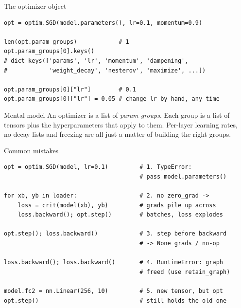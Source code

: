 \documentclass[10pt,aspectratio=169]{beamer}
\begin{document}
\begin{frame}[fragile]{The optimizer object}
\begin{lstlisting}
opt = optim.SGD(model.parameters(), lr=0.1, momentum=0.9)

len(opt.param_groups)            # 1
opt.param_groups[0].keys()
# dict_keys(['params', 'lr', 'momentum', 'dampening',
#            'weight_decay', 'nesterov', 'maximize', ...])

opt.param_groups[0]["lr"]        # 0.1
opt.param_groups[0]["lr"] = 0.05 # change lr by hand, any time
\end{lstlisting}
\begin{block}{Mental model}
An optimizer is a list of \emph{param groups}. Each group is a list of tensors plus the
hyperparameters that apply to them. Per-layer learning rates, no-decay lists and freezing are
all just a matter of building the right groups.
\end{block}
\end{frame}

\begin{frame}[fragile]{Common mistakes}
\begin{lstlisting}
opt = optim.SGD(model, lr=0.1)         # 1. TypeError:
                                       # pass model.parameters()

for xb, yb in loader:                  # 2. no zero_grad ->
    loss = crit(model(xb), yb)         # grads pile up across
    loss.backward(); opt.step()        # batches, loss explodes

opt.step(); loss.backward()            # 3. step before backward
                                       # -> None grads / no-op

loss.backward(); loss.backward()       # 4. RuntimeError: graph
                                       # freed (use retain_graph)

model.fc2 = nn.Linear(256, 10)         # 5. new tensor, but opt
opt.step()                             # still holds the old one
\end{lstlisting}
\end{frame}
\end{document}
